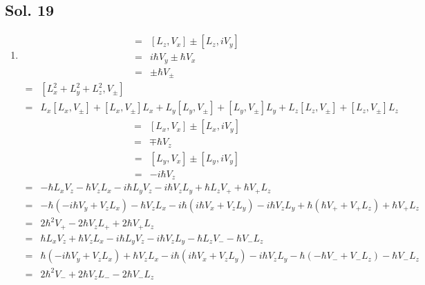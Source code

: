 \subsection*{Sol. 19}
\begin{enumerate}
    \item 
    \begin{align*}
    [L_z, V_\pm] = &
    [L_z, V_x]\pm [L_z, iV_y]\\
    =&i\hbar V_y \pm \hbar V_x\\
    =&\pm \hbar V_\pm
    \end{align*}
    \begin{align*}
        [L^2, V_\pm] =& 
        [L_x^2+L_y^2+L_z^2, V_\pm] \\
        =&L_x[L_x,V_\pm]+[L_x,V_\pm]L_x+L_y[L_y,V_\pm]+[L_y,V_\pm]L_y+L_z[L_z,V_\pm]+[L_z,V_\pm]L_z
    \end{align*}
    \begin{align*}
        [L_x, V_\pm] =& [L_x, V_x]\pm [L_x, iV_y]\\
        =&\mp \hbar V_z
    \end{align*}
    \begin{align*}
        [L_y, V_\pm] =& [L_y, V_x]\pm [L_y, iV_y]\\
        =&- i\hbar V_z
    \end{align*}
    \begin{align*}
        [L^2, V_+] = &
        -\hbar L_xV_z
        -\hbar V_zL_x-
        i\hbar
        L_yV_z
        -i\hbar V_zL_y+
        \hbar L_zV_+
        +\hbar V_+L_z\\
        =&
        -\hbar (-i\hbar V_y+V_zL_x)
        -\hbar V_zL_x-
        i\hbar
        (i\hbar V_x+V_zL_y)
        -i\hbar V_zL_y+
        \hbar (\hbar V_++V_+L_z)
        +\hbar V_+L_z\\
        =&2\hbar^2V_+-2\hbar V_zL_++2\hbar V_+L_z
    \end{align*}
    \begin{align*}
        [L^2, V_-] = &
        \hbar L_xV_z
        +\hbar V_zL_x
        -
        i\hbar
        L_yV_z
        -i\hbar V_zL_y
        -
        \hbar L_zV_-
        -\hbar V_-L_z\\
        =&
        \hbar (-i\hbar V_y+V_zL_x)
        +\hbar V_zL_x
        -
        i\hbar
        (i\hbar V_x+V_zL_y)
        -i\hbar V_zL_y-
        \hbar (-\hbar V_-+V_-L_z)
        -\hbar V_-L_z\\
        =&2\hbar^2V_-+2\hbar V_zL_--2\hbar V_-L_z
    \end{align*}

\end{enumerate}
